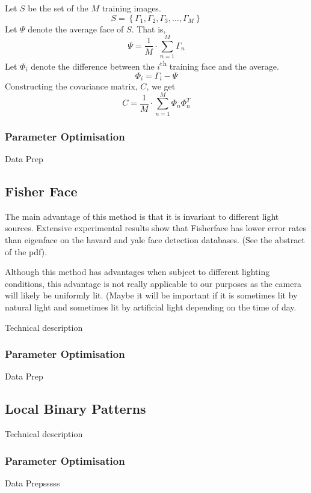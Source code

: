 \documentclass{article}
\begin{document}
\vspace{12pt} \noindent Let $S$ be the set of the $M$ training images.
\begin{equation}
	S = \left\{\Gamma_1, \Gamma_2, \Gamma_3, \ldots, \Gamma_M\right\}
\end{equation}
Let $\Psi$ denote the average face of $S$. That is,
\begin{equation}
	\Psi = \frac{1}{M}\cdot\sum_{n=1}^{M}\Gamma_n
\end{equation}
Let $\Phi_i$ denote the difference between the $i$\textsuperscript{th} training face and the average.
\begin{equation}
	\Phi_i = \Gamma_i - \Psi
\end{equation}
Constructing the covariance matrix, $C$, we get
\begin{equation}
	C = \frac{1}{M}\cdot\sum_{n=1}^{M}\Phi_n \Phi_n^T
\end{equation}

\subsubsection{Parameter Optimisation}
Data Prep

\subsection{Fisher Face}
The main advantage of this method is that it is invariant to different light sources. Extensive experimental results show that Fisherface has lower error rates than eigenface on the havard and yale face detection databases. (See the abstract of the pdf).

Although this method has advantages when subject to different lighting conditions, this advantage is not really applicable to our purposes as the camera will likely be uniformly lit. (Maybe it will be important if it is sometimes lit by natural light and sometimes lit by artificial light depending on the time of day.


Technical description
\subsubsection{Parameter Optimisation}
Data Prep

\subsection{Local Binary Patterns}
Technical description
\subsubsection{Parameter Optimisation}
Data Prepsssss
\end{document}
